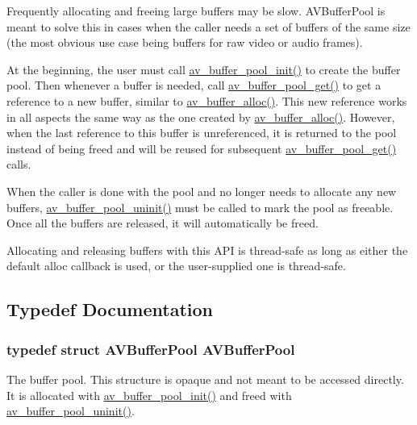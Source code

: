 Frequently allocating and freeing large buffers may be slow. A\+V\+Buffer\+Pool is meant to solve this in cases when the caller needs a set of buffers of the same size (the most obvious use case being buffers for raw video or audio frames).

At the beginning, the user must call \hyperlink{group__lavu__bufferpool_ga26af9b07c08bc7fd2cfc62767e490b93}{av\+\_\+buffer\+\_\+pool\+\_\+init()} to create the buffer pool. Then whenever a buffer is needed, call \hyperlink{group__lavu__bufferpool_ga2c745ecb4001452423e775b06b20fb7c}{av\+\_\+buffer\+\_\+pool\+\_\+get()} to get a reference to a new buffer, similar to \hyperlink{group__lavu__buffer_ga5ae84ac902283dea1a660ede06c1cdac}{av\+\_\+buffer\+\_\+alloc()}. This new reference works in all aspects the same way as the one created by \hyperlink{group__lavu__buffer_ga5ae84ac902283dea1a660ede06c1cdac}{av\+\_\+buffer\+\_\+alloc()}. However, when the last reference to this buffer is unreferenced, it is returned to the pool instead of being freed and will be reused for subsequent \hyperlink{group__lavu__bufferpool_ga2c745ecb4001452423e775b06b20fb7c}{av\+\_\+buffer\+\_\+pool\+\_\+get()} calls.

When the caller is done with the pool and no longer needs to allocate any new buffers, \hyperlink{group__lavu__bufferpool_ga7b76781c5944b3bb59b2e3b1a8994e4a}{av\+\_\+buffer\+\_\+pool\+\_\+uninit()} must be called to mark the pool as freeable. Once all the buffers are released, it will automatically be freed.

Allocating and releasing buffers with this A\+PI is thread-\/safe as long as either the default alloc callback is used, or the user-\/supplied one is thread-\/safe. 

\subsection{Typedef Documentation}
\subsubsection[{\texorpdfstring{A\+V\+Buffer\+Pool}{AVBufferPool}}]{\setlength{\rightskip}{0pt plus 5cm}typedef struct {\bf A\+V\+Buffer\+Pool} {\bf A\+V\+Buffer\+Pool}}\hypertarget{group__lavu__bufferpool_ga13bc8038952b61bae4d591f30c7421f6}{}\label{group__lavu__bufferpool_ga13bc8038952b61bae4d591f30c7421f6}
The buffer pool. This structure is opaque and not meant to be accessed directly. It is allocated with \hyperlink{group__lavu__bufferpool_ga26af9b07c08bc7fd2cfc62767e490b93}{av\+\_\+buffer\+\_\+pool\+\_\+init()} and freed with \hyperlink{group__lavu__bufferpool_ga7b76781c5944b3bb59b2e3b1a8994e4a}{av\+\_\+buffer\+\_\+pool\+\_\+uninit()}. 

